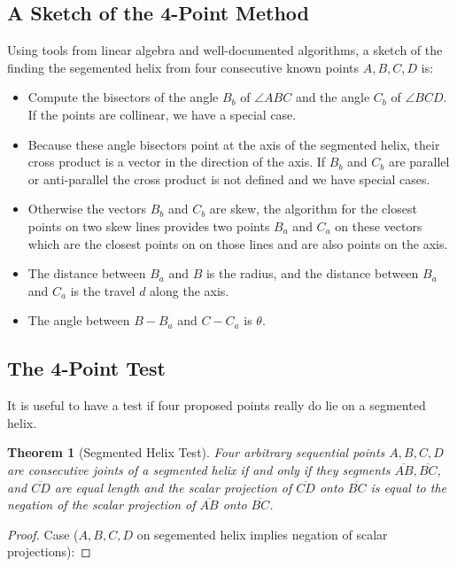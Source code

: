 \documentclass[11pt]{article}
\newtheorem{theorem}{Theorem}
\begin{document}
{\subsection{A Sketch of the 4-Point Method}

Using tools from linear algebra and well-documented algorithms, a sketch of the finding the segemented helix from
four consecutive known points $A,B,C,D$ is:
\begin{itemize}
\item Compute the bisectors of the angle $B_b$ of $ \angle{ABC}$ and the angle $C_b$ of $\angle{BCD}$.
  If the points are collinear, we have a special case.
\item Because these angle bisectors point at the axis of the segmented helix, their cross product is a vector
  in the direction of the axis. If $B_b$ and $C_b$ are parallel or anti-parallel the cross product is not defined
  and we have special cases.
\item  Otherwise the vectors $B_b$ and $C_b$ are skew, the algorithm for the closest points on two skew lines provides two points $B_a$ and $C_a$ on these vectors which
  are the closest points on on those lines and are also points on the axis.
\item The distance between $B_a$ and $B$ is the radius, and the distance between $B_a$ and $C_a$ is the travel $d$ along the axis.
  \item The angle between $B - B_a$ and $C - C_a$ is $\theta$.
  \end{itemize}

\subsection{The 4-Point Test}

It is useful to have a test if four proposed points really do lie on a segmented helix.

\begin{theorem}[Segmented Helix Test]
  Four arbitrary sequential points $A,B,C,D$ are consecutive joints of a segmented helix if and only if
  they segments $\overline{AB},\overline{BC}$, and $\overline{CD}$ are equal length and the scalar projection
  of $\overline{CD}$ onto $\overline{BC}$ is equal to the negation of the scalar projection of $\overline{AB}$ onto $\overline{BC}$.
\end{theorem}

\begin{proof}
  Case ($A,B,C,D$ on segemented helix implies negation of scalar projections):


\end{proof}}
\end{document}

